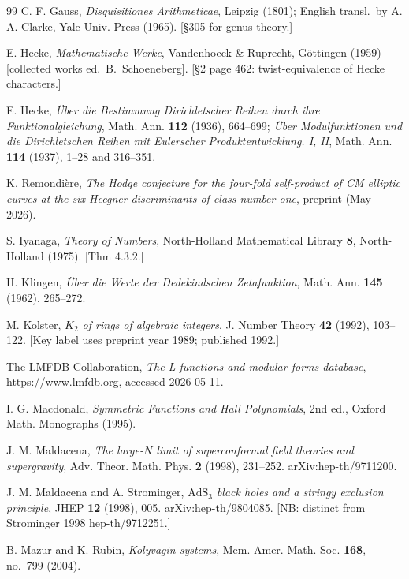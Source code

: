 \documentclass[11pt,a4paper]{amsart}
\theoremstyle{definition}
\begin{document}
\begin{thebibliography}{99}
 C. F. Gauss, \emph{Disquisitiones Arithmeticae}, Leipzig (1801); English transl.\ by A. A. Clarke, Yale Univ. Press (1965). [\S305 for genus theory.]

 E. Hecke, \emph{Mathematische Werke}, Vandenhoeck \& Ruprecht, G\"ottingen (1959) [collected works ed.\ B.\ Schoeneberg]. [\S2 page 462: twist-equivalence of Hecke characters.]

 E. Hecke, \emph{\"Uber die Bestimmung Dirichletscher Reihen durch ihre Funktionalgleichung}, Math. Ann. \textbf{112} (1936), 664--699; \emph{\"Uber Modulfunktionen und die Dirichletschen Reihen mit Eulerscher Produktentwicklung. I, II}, Math. Ann. \textbf{114} (1937), 1--28 and 316--351.

 K. Remondi\`ere, \emph{The Hodge conjecture for the four-fold self-product of CM elliptic curves at the six Heegner discriminants of class number one}, preprint (May 2026).

 S. Iyanaga, \emph{Theory of Numbers}, North-Holland Mathematical Library \textbf{8}, North-Holland (1975). [Thm 4.3.2.]

 H. Klingen, \emph{\"Uber die Werte der Dedekindschen Zetafunktion}, Math. Ann. \textbf{145} (1962), 265--272.

 M. Kolster, \emph{$K_2$ of rings of algebraic integers}, J. Number Theory \textbf{42} (1992), 103--122. [Key label uses preprint year 1989; published 1992.]

 The LMFDB Collaboration, \emph{The L-functions and modular forms database}, \url{https://www.lmfdb.org}, accessed 2026-05-11.

 I. G. Macdonald, \emph{Symmetric Functions and Hall Polynomials}, 2nd ed., Oxford Math. Monographs (1995).

 J. M. Maldacena, \emph{The large-$N$ limit of superconformal field theories and supergravity}, Adv. Theor. Math. Phys. \textbf{2} (1998), 231--252. arXiv:hep-th/9711200.

 J. M. Maldacena and A. Strominger, \emph{$\mathrm{AdS}_3$ black holes and a stringy exclusion principle}, JHEP \textbf{12} (1998), 005. arXiv:hep-th/9804085. [NB: distinct from Strominger 1998 hep-th/9712251.]

 B. Mazur and K. Rubin, \emph{Kolyvagin systems}, Mem. Amer. Math. Soc. \textbf{168}, no.\ 799 (2004).


\end{thebibliography}
\end{document}
